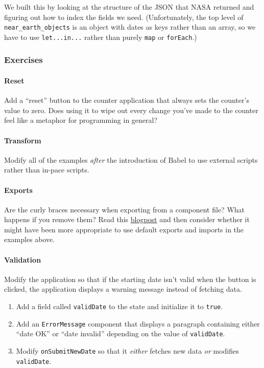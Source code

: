 We built this by looking at the structure of the JSON that NASA returned
and figuring out how to index the fields we need. (Unfortunately, the
top level of \texttt{near\_earth\_objects} is an object with dates as
keys rather than an array, so we have to use \texttt{let...in...} rather
than purely \texttt{map} or \texttt{forEach}.)

\subsubsection{Exercises}\label{s:interactive-exercises}

\paragraph{Reset}\label{reset}

Add a ``reset'' button to the counter application that always sets the
counter's value to zero. Does using it to wipe out every change you've
made to the counter feel like a metaphor for programming in general?

\paragraph{Transform}\label{transform}

Modify all of the examples \emph{after} the introduction of Babel to use
external scripts rather than in-pace scripts.

\paragraph{Exports}\label{exports}

Are the curly braces necessary when exporting from a component file?
What happens if you remove them? Read this
\href{http://2ality.com/2014/09/es6-modules-final.html}{blogpost} and
then consider whether it might have been more appropriate to use default
exports and imports in the examples above.

\paragraph{Validation}\label{validation}

Modify the application so that if the starting date isn't valid when the
button is clicked, the application displays a warning message instead of
fetching data.

\begin{enumerate}
\tightlist
\item
  Add a field called \texttt{validDate} to the state and initialize it
  to \texttt{true}.
\item
  Add an \texttt{ErrorMessage} component that displays a paragraph
  containing either ``date OK'' or ``date invalid'' depending on the
  value of \texttt{validDate}.
\item
  Modify \texttt{onSubmitNewDate} so that it \emph{either} fetches new
  data \emph{or} modifies \texttt{validDate}.
\end{enumerate}

